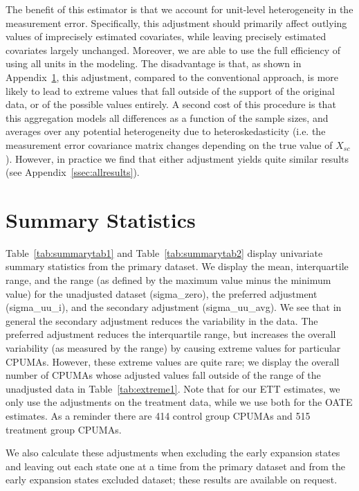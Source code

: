 \documentclass{article}
\begin{document}
\begin{appendix}
The benefit of this estimator is that we account for unit-level heterogeneity in the measurement error. Specifically, this adjustment should primarily affect outlying values of imprecisely estimated covariates, while leaving precisely estimated covariates largely unchanged. Moreover, we are able to use the full efficiency of using all units in the modeling. The disadvantage is that, as shown in Appendix~\ref{sec:appendixsumstat}, this adjustment, compared to the conventional approach, is more likely to lead to extreme values that fall outside of the support of the original data, or of the possible values entirely. A second cost of this procedure is that this aggregation models all differences as a function of the sample sizes, and averages over any potential heterogeneity due to heteroskedasticity (i.e. the measurement error covariance matrix changes depending on the true value of $X_{sc}$). However, in practice we find that either adjustment yields quite similar results (see Appendix~\ref{ssec:allresults}).

\section{Summary Statistics}
\label{sec:appendixsumstat}

Table~\ref{tab:summarytab1} and Table~\ref{tab:summarytab2} display univariate summary statistics from the primary dataset. We display the mean, interquartile range, and the range (as defined by the maximum value minus the minimum value) for the unadjusted dataset (sigma\_zero), the preferred adjustment (sigma\_uu\_i), and the secondary adjustment (sigma\_uu\_avg). We see that in general the secondary adjustment reduces the variability in the data. The preferred adjustment reduces the interquartile range, but increases the overall variability (as measured by the range) by causing extreme values for particular CPUMAs. However, these extreme values are quite rare; we display the overall number of CPUMAs whose adjusted values fall outside of the range of the unadjusted data in Table~\ref{tab:extreme1}. Note that for our ETT estimates, we only use the adjustments on the treatment data, while we use both for the OATE estimates. As a reminder there are 414 control group CPUMAs and 515 treatment group CPUMAs.

We also calculate these adjustments when excluding the early expansion states and leaving out each state one at a time from the primary dataset and from the early expansion states excluded dataset; these results are available on request. 


\end{appendix}
\end{document}
